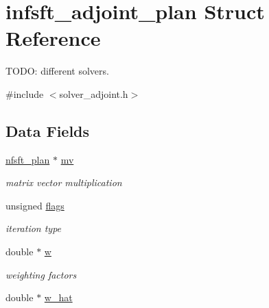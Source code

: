 \hypertarget{structinfsft__adjoint__plan}{\section{infsft\-\_\-adjoint\-\_\-plan Struct Reference}
\label{structinfsft__adjoint__plan}
}


T\-O\-D\-O\-: different solvers.  




{\ttfamily \#include $<$solver\-\_\-adjoint.\-h$>$}

\subsection*{Data Fields}
\begin{DoxyCompactItemize}
\item 
\hypertarget{structinfsft__adjoint__plan_a791fe047a3b45cce8049e83d422b8414}{\hyperlink{structnfsft__plan}{nfsft\-\_\-plan} $\ast$ \hyperlink{structinfsft__adjoint__plan_a791fe047a3b45cce8049e83d422b8414}{mv}}\label{structinfsft__adjoint__plan_a791fe047a3b45cce8049e83d422b8414}

\begin{DoxyCompactList}\small\item\em matrix vector multiplication \end{DoxyCompactList}\item 
\hypertarget{structinfsft__adjoint__plan_a6795cda9e0d83c5b5c7935b75d10dc1a}{unsigned \hyperlink{structinfsft__adjoint__plan_a6795cda9e0d83c5b5c7935b75d10dc1a}{flags}}\label{structinfsft__adjoint__plan_a6795cda9e0d83c5b5c7935b75d10dc1a}

\begin{DoxyCompactList}\small\item\em iteration type \end{DoxyCompactList}\item 
\hypertarget{structinfsft__adjoint__plan_a9738a7ae6eb6e9ac59018d7fe0b67b32}{double $\ast$ \hyperlink{structinfsft__adjoint__plan_a9738a7ae6eb6e9ac59018d7fe0b67b32}{w}}\label{structinfsft__adjoint__plan_a9738a7ae6eb6e9ac59018d7fe0b67b32}

\begin{DoxyCompactList}\small\item\em weighting factors \end{DoxyCompactList}\item 
\hypertarget{structinfsft__adjoint__plan_a5830886454142e4825347a703f286c0a}{double $\ast$ \hyperlink{structinfsft__adjoint__plan_a5830886454142e4825347a703f286c0a}{w\-\_\-hat}}\label{structinfsft__adjoint__plan_a5830886454142e4825347a703f286c0a}


\end{DoxyCompactItemize}
